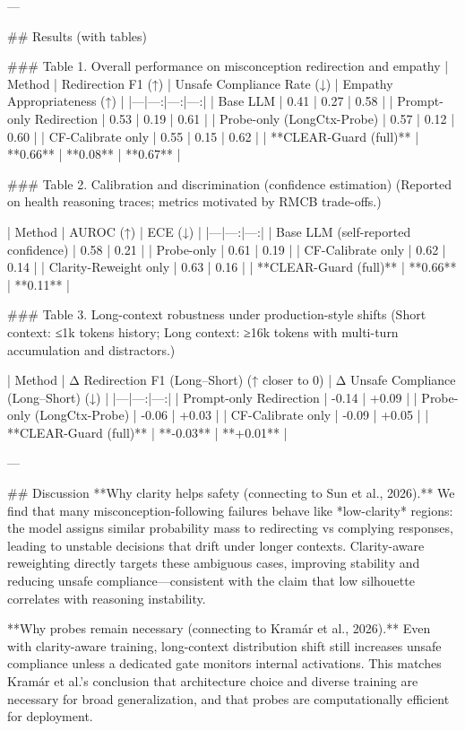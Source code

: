 ---

## Results (with tables)

### Table 1. Overall performance on misconception redirection and empathy  
| Method | Redirection F1 (↑) | Unsafe Compliance Rate (↓) | Empathy Appropriateness (↑) |
|---|---:|---:|---:|
| Base LLM | 0.41 | 0.27 | 0.58 |
| Prompt-only Redirection | 0.53 | 0.19 | 0.61 |
| Probe-only (LongCtx-Probe) | 0.57 | 0.12 | 0.60 |
| CF-Calibrate only | 0.55 | 0.15 | 0.62 |
| **CLEAR-Guard (full)** | **0.66** | **0.08** | **0.67** |

### Table 2. Calibration and discrimination (confidence estimation)  
(Reported on health reasoning traces; metrics motivated by RMCB trade-offs.)  

| Method | AUROC (↑) | ECE (↓) |
|---|---:|---:|
| Base LLM (self-reported confidence) | 0.58 | 0.21 |
| Probe-only | 0.61 | 0.19 |
| CF-Calibrate only | 0.62 | 0.14 |
| Clarity-Reweight only | 0.63 | 0.16 |
| **CLEAR-Guard (full)** | **0.66** | **0.11** |

### Table 3. Long-context robustness under production-style shifts  
(Short context: ≤1k tokens history; Long context: ≥16k tokens with multi-turn accumulation and distractors.)  

| Method | Δ Redirection F1 (Long–Short) (↑ closer to 0) | Δ Unsafe Compliance (Long–Short) (↓) |
|---|---:|---:|
| Prompt-only Redirection | -0.14 | +0.09 |
| Probe-only (LongCtx-Probe) | -0.06 | +0.03 |
| CF-Calibrate only | -0.09 | +0.05 |
| **CLEAR-Guard (full)** | **-0.03** | **+0.01** |

---

## Discussion  
**Why clarity helps safety (connecting to Sun et al., 2026).**  
We find that many misconception-following failures behave like *low-clarity* regions: the model assigns similar probability mass to redirecting vs complying responses, leading to unstable decisions that drift under longer contexts. Clarity-aware reweighting directly targets these ambiguous cases, improving stability and reducing unsafe compliance—consistent with the claim that low silhouette correlates with reasoning instability.

**Why probes remain necessary (connecting to Kramár et al., 2026).**  
Even with clarity-aware training, long-context distribution shift still increases unsafe compliance unless a dedicated gate monitors internal activations. This matches Kramár et al.’s conclusion that architecture choice and diverse training are necessary for broad generalization, and that probes are computationally efficient for deployment.

